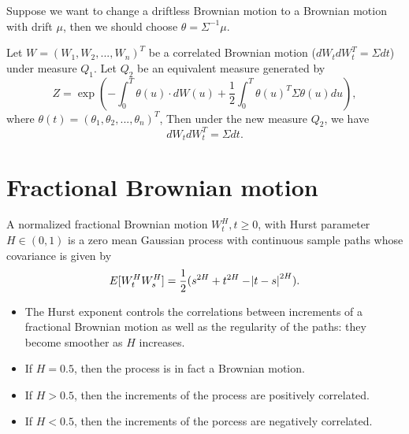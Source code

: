 \begin{refsection}
\begin{remark}
	Suppose we want to change a driftless Brownian motion to a Brownian motion with drift $\mu$, then we should choose $\theta = \Sigma^{-1}\mu$.	
\end{remark}


\begin{corollary}\label{ch:theory-of-stochastic-process:th:CorrelationInvarianceUnderChangeOfMeasure}
	Let $W = (W_1,W_2,...,W_n)^T$ be a correlated Brownian motion ($dW_tdW_t^T = \Sigma dt$) under measure $Q_1$. Let $Q_2$ be an equivalent measure generated by
	$$Z = \exp(-\int_0^T \theta(u)\cdot dW(u) + \frac{1}{2} \int_0^T \theta(u)^T\Sigma \theta(u) du),$$
	where $\theta(t) = (\theta_1,\theta_2,...,\theta_n)^T$, 
	Then under the new measure $Q_2$, we have
	$$dW_tdW_t^T = \Sigma dt.$$
\end{corollary}



\section{Fractional Brownian motion}
\begin{definition}\cite[16]{pavliotis2014stochastic}
	A normalized fractional Brownian motion $W_t^H,t\geq 0$, with Hurst parameter $H\in (0,1)$ is a zero mean Gaussian process with continuous sample paths whose covariance is given by
	$$E[W_t^HW_s^H] = \frac{1}{2}(s^{2H} + t^{2H} - \abs{t-s}^{2H}).$$
\end{definition}

\begin{remark}[interpretation]\hfill
	\begin{itemize}
		\item The Hurst exponent controls the correlations between increments of a fractional Brownian motion as well as the regularity of the paths: they become smoother as $H$ increases.
		\item If $H=0.5$, then the process is in fact a Brownian motion.
		\item If $H > 0.5$, then the increments of the process are positively correlated.
		\item If $H < 0.5$, then the increments of the porcess are negatively correlated.
	\end{itemize}
	
\end{remark}


\end{refsection}
